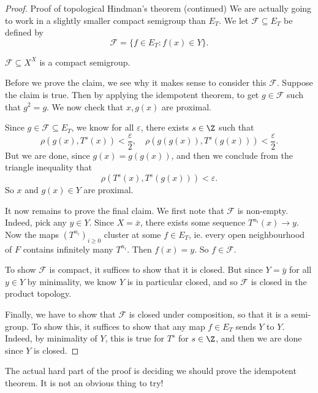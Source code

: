 \documentclass[a4paper]{article}
\begin{document}
\begin{proof}{Proof of topological Hindman's theorem (continued)}
  We are actually going to work in a slightly smaller compact semigroup than $E_T$. We let $\mathcal{F} \subseteq E_T$ be defined by
  \[
    \mathcal{F} = \{f \in E_T: f(x) \in Y\}.
  \]
  \begin{claim}
    $\mathcal{F} \subseteq X^X$ is a compact semigroup.
  \end{claim}
  Before we prove the claim, we see why it makes sense to consider this $\mathcal{F}$. Suppose the claim is true. Then by applying the idempotent theorem, to get $g \in \mathcal{F}$ such that $g^2 = g$. We now check that $x, g(x)$ are proximal.

  Since $g \in \mathcal{F} \subseteq E_T$, we know for all $\varepsilon$, there exists $s \in \Z$ such that
  \[
    \rho(g(x), T^s(x)) < \frac{\varepsilon}{2},\quad \rho(g(g(x)), T^s(g(x))) < \frac{\varepsilon}{2}.
  \]
  But we are done, since $g(x) = g(g(x))$, and then we conclude from the triangle inequality that
  \[
    \rho(T^s(x), T^s(g(x))) < \varepsilon.
  \]
  So $x$ and $g(x) \in Y$ are proximal.

  It now remains to prove the final claim. We first note that $\mathcal{F}$ is non-empty. Indeed, pick any $y \in Y$. Since $X = \bar{x}$, there exists some sequence $T^{n_i}(x) \to y$. Now the maps $(T^{n_i})_{i \geq 0}$ cluster at some $f \in E_T$, ie. every open neighbourhood of $F$ contains infinitely many $T^{n_i}$. Then $f(x) = y$. So $f \in \mathcal{F}$. %

  To show $\mathcal{F}$ is compact, it suffices to show that it is closed. But since $Y = \bar{y}$ for all $y \in Y$ by minimality, we know $Y$ is in particular closed, and so $\mathcal{F}$ is closed in the product topology.

  Finally, we have to show that $\mathcal{F}$ is closed under composition, so that it is a semi-group. To show this, it suffices to show that any map $f \in E_T$ sends $Y$ to $Y$. Indeed, by minimality of $Y$, this is true for $T^s$ for $s \in \Z$, and then we are done since $Y$ is closed.
\end{proof}
The actual hard part of the proof is deciding we should prove the idempotent theorem. It is not an obvious thing to try!
\printindex
\end{document}
